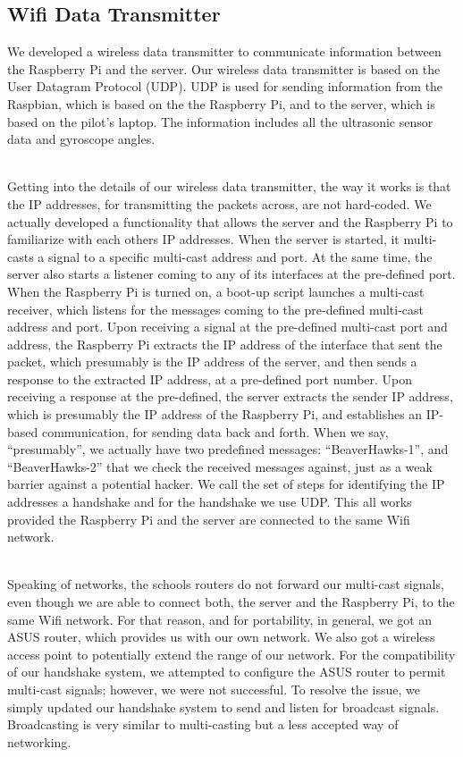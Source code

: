 \documentclass[onecolumn, oneside, letterpaper, draftclsnofoot, 10pt, compsoc]{IEEEtran}
\begin{document}

\subsection{Wifi Data Transmitter}
\noindent
We developed a wireless data transmitter to communicate information between the Raspberry Pi and the server. Our wireless data transmitter is based on the User Datagram Protocol (UDP). UDP is used for sending information from the Raspbian, which is based on the the Raspberry Pi, and to the server, which is based on the pilot's laptop. The information includes all the ultrasonic sensor data and gyroscope angles.

\noindent \\
Getting into the details of our wireless data transmitter, the way it works is that the IP addresses, for transmitting the packets across, are not hard-coded. We actually developed a functionality that allows the server and the Raspberry Pi to familiarize with each others IP addresses. When the server is started, it multi-casts a signal to a specific multi-cast address and port. At the same time, the server also starts a listener coming to any of its interfaces at the pre-defined port. When the Raspberry Pi is turned on, a boot-up script launches a multi-cast receiver, which listens for the messages coming to the pre-defined multi-cast address and port. Upon receiving a signal at the pre-defined multi-cast port and address, the Raspberry Pi extracts the IP address of the interface that sent the packet, which presumably is the IP address of the server, and then sends a response to the extracted IP address, at a pre-defined port number. Upon receiving a response at the pre-defined, the server extracts the sender IP address, which is presumably the IP address of the Raspberry Pi, and establishes an IP-based communication, for sending data back and forth. When we say, ``presumably'', we actually have two predefined messages: ``BeaverHawks-1'', and ``BeaverHawks-2'' that we check the received messages against, just as a weak barrier against a potential hacker. We call the set of steps for identifying the IP addresses a handshake and for the handshake we use UDP. This all works provided the Raspberry Pi and the server are connected to the same Wifi network.

\noindent \\
Speaking of networks, the school\textquotesingle s routers do not forward our multi-cast signals, even though we are able to connect both, the server and the Raspberry Pi, to the same Wifi network. For that reason, and for portability, in general, we got an ASUS router, which provides us with our own network. We also got a wireless access point to potentially extend the range of our network. For the compatibility of our handshake system, we attempted to configure the ASUS router to permit multi-cast signals; however, we were not successful. To resolve the issue, we simply updated our handshake system to send and listen for broadcast signals. Broadcasting is very similar to multi-casting but a less accepted way of networking.
\end{document}
